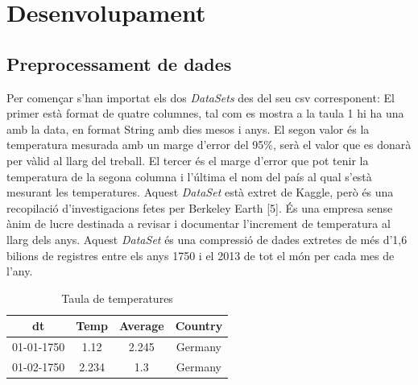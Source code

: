 \documentclass[10pt,a4paper,twocolumn,twoside]{article}
\begin{document}
\section {Desenvolupament}
\subsection{Preprocessament de dades}
Per començar s'han importat els dos \textit{DataSets} des del seu csv corresponent:
El primer està format de quatre columnes, tal com es mostra a la taula 1 hi ha una amb la data, en format String amb dies mesos i anys. El segon valor és la temperatura mesurada amb un marge d'error del 95\%, serà el valor que es donarà per vàlid al llarg del treball. El tercer és el marge d'error que pot tenir la temperatura de la segona columna i l'última el nom del país al qual s'està mesurant les temperatures. Aquest \textit{DataSet} està extret de Kaggle, però és una recopilació d'investigacions fetes per Berkeley Earth [5]. És una empresa sense ànim de lucre destinada a revisar i documentar l'increment de temperatura al llarg dels anys. Aquest \textit{DataSet} és una compressió de dades extretes de més d'1,6 bilions de registres entre els anys 1750 i el 2013 de tot el món per cada mes de l'any.
\begin{table}[ht]
\caption{Taula de temperatures}
\begin{center}
\begin{tabular}{c c c c} %
\hline\hline %
dt & Temp & Average & Country \\
\hline
01-01-1750 & 1.12 & 2.245 & Germany \\
01-02-1750 & 2.234 & 1.3 & Germany \\
\hline
\end{tabular}
\end{center}
\end{table}
\end{document}
